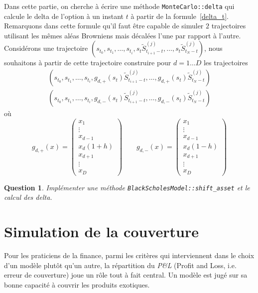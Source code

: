 \documentclass[a4paper,11pt]{article}
\def\var#1{{\tt #1}}
\newtheorem{question}{Question}
\begin{document}
Dans cette partie, on cherche à écrire une méthode \var{MonteCarlo::delta} qui calcule le delta de l'option à un instant $t$ à partir de la formule~\eqref{delta_t}.  Remarquons dans cette formule qu'il faut être capable de simuler $2$ trajectoires utilisant les mêmes aléas Browniens mais décalées l'une par rapport à l'autre. Considérons une trajectoire $(s_{t_0}, s_{t_1}, \dots, s_{t_i}, s_t \tilde S_{t_{i+1} - t}^{(j)}, \dots,  s_t \tilde S_{t_N - t}^{(j)})$, nous souhaitons à partir de cette trajectoire construire pour $d=1\dots D$ les trajectoires
\begin{align*}
  (s_{t_0}, s_{t_1}, \dots, s_{t_i}, g_{d,+}(s_t) \tilde S_{t_{i+1} - t}^{(j)},
 \dots,  g_{d,+}(s_t) \tilde S_{t_N - t}^{(j)})  \\
 (s_{t_0}, s_{t_1}, \dots, s_{t_i}, g_{d,-}(s_t) \tilde S_{t_{i+1} - t}^{(j)},
 \dots, g_{d,-}(s_t)   \tilde S_{t_N - t}^{(j)})
\end{align*}
où
\begin{equation*}
  g_{d,+}(x)  = \left(\begin{array}{c}
    x_1 \\
    \vdots\\
    x_{d-1} \\
    x_d (1+h) \\
    x_{d+1} \\
    \vdots\\
    x_D
  \end{array}\right) \qquad g_{d,-}(x)  = \left(\begin{array}{c}
    x_1 \\
    \vdots\\
    x_{d-1} \\
    x_d (1-h) \\
    x_{d+1} \\
    \vdots\\
    x_D
  \end{array}\right)
\end{equation*}

\begin{question}
  Implémenter une méthode \var{BlackScholesModel::shift\_asset} et le calcul des delta.
\end{question}


\section{Simulation de la couverture}
\label{couverture}

Pour les praticiens de la finance, parmi les critères qui interviennent dans le choix d'un modèle plutôt qu'un autre, la répartition du {\it P\&L} (Profit and Loss, i.e. erreur de couverture) joue un rôle tout à fait central. Un modèle est jugé sur sa bonne capacité à couvrir les produits exotiques.
\end{document}
